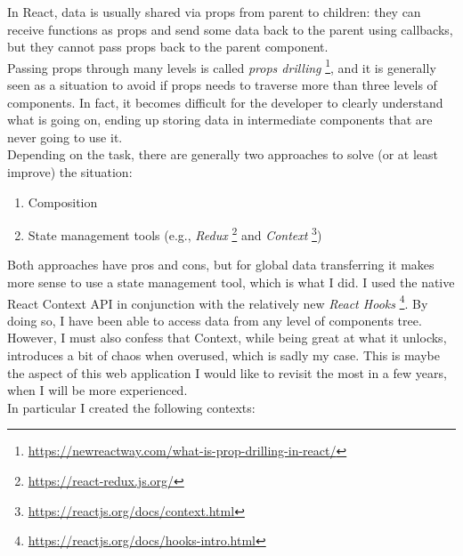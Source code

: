 \documentclass[]{usiinfbachelorproject}
\begin{document}
In React, data is usually shared via props from parent to children: they can receive functions as props and send some data back to the parent using callbacks, but they cannot pass props back to the parent component.\\ Passing props through many levels is called \emph{props drilling} \footnote{\url{https://newreactway.com/what-is-prop-drilling-in-react/}}, and it is generally seen as a situation to avoid if props needs to traverse more than three levels of components. In fact, it becomes difficult for the developer to clearly understand what is going on, ending up storing data in intermediate components that are never going to use it.\\

\noindent Depending on the task, there are generally two approaches to solve (or at least improve) the situation:

\begin{enumerate}
	\item Composition
	\item State management tools (e.g., \emph{Redux} \footnote{\url{https://react-redux.js.org/}} and \emph{Context} \footnote{\url{https://reactjs.org/docs/context.html}})
\end{enumerate}

\noindent Both approaches have pros and cons, but for global data transferring it makes more sense to use a state management tool, which is what I did. I used the native React Context API in conjunction with the relatively new \emph{React Hooks} \footnote{\url{https://reactjs.org/docs/hooks-intro.html}}. By doing so, I have been able to access data from any level of components tree. However, I must also confess that Context, while being great at what it unlocks, introduces a bit of chaos when overused, which is sadly my case. This is maybe the aspect of this web application I would like to revisit the most in a few years, when I will be more experienced.\\

\noindent In particular I created the following contexts:
\end{document}
